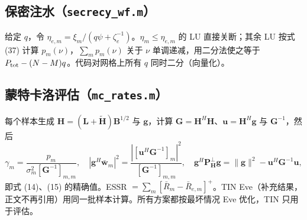 \documentclass[11pt,a4paper]{ctexart}
\newcommand{\code}[1]{\texttt{#1}}
\newcommand{\Ptot}{P_{\rm tot}}
\begin{document}
\subsection{保密注水（\code{secrecy\_wf.m}）}
给定 $q$，令 $\eta_{e,m}=\xi_m/(q\psi+\zeta_e^{-1})$。$\eta_m\le\eta_{e,m}$ 的 LU 直接关断；其余 LU 按式 (37) 计算 $p_m(\nu)$，$\sum_mp_m(\nu)$ 关于 $\nu$ 单调递减，用二分法使之等于 $\Ptot-(N-M)q$。代码对网格上所有 $q$ 同时二分（向量化）。

\subsection{蒙特卡洛评估（\code{mc\_rates.m}）}
每个样本生成 $\mathbf H=(\mathbf L+\tilde{\mathbf H})\mathbf B^{1/2}$ 与 $\mathbf g$，计算 $\mathbf G=\mathbf H^H\mathbf H$、$\mathbf u=\mathbf H^H\mathbf g$ 与 $\mathbf G^{-1}$，然后
\[
\gamma_m=\frac{p_m}{\sigma_m^2[\mathbf G^{-1}]_{m,m}},\quad
|\mathbf g^H\bar{\mathbf w}_m|^2=\frac{|[\mathbf u^H\mathbf G^{-1}]_m|^2}{[\mathbf G^{-1}]_{m,m}},\quad
\mathbf g^H\mathbf P_{\mathbf H}^\perp\mathbf g=\|\mathbf g\|^2-\mathbf u^H\mathbf G^{-1}\mathbf u,
\]
即式 (14)、(15) 的精确值。ESSR $=\sum_m[\bar R_m-\bar R_{e,m}]^+$。TIN Eve（补充结果，正文不再引用）用同一批样本计算。所有方案都按最坏情况 Eve 优化，TIN 只用于评估。

\end{document}
